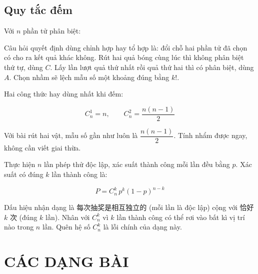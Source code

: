 \documentclass[11pt, a4paper]{article}
\begin{document}
\subsection{Quy tắc đếm}

\begin{dinhly}
Với $n$ phần tử phân biệt:


 Câu hỏi quyết định dùng chỉnh hợp hay tổ hợp là: đổi chỗ hai phần tử đã chọn có cho ra kết quả khác không. Rút hai quả bóng cùng lúc thì không phân biệt thứ tự, dùng $C$. Lấy lần lượt quả thứ nhất rồi quả thứ hai thì có phân biệt, dùng $A$. Chọn nhầm sẽ lệch mẫu số một khoảng đúng bằng $k!$.

 Hai công thức hay dùng nhất khi đếm:

$$C_n^1 = n, \qquad C_n^2 = \frac{n(n-1)}{2}$$

Với bài rút hai vật, mẫu số gần như luôn là $\dfrac{n(n-1)}{2}$. Tính nhẩm được ngay, không cần viết giai thừa.
\end{dinhly}
\begin{dinhly}
Thực hiện $n$ lần phép thử độc lập, xác suất thành công mỗi lần đều bằng $p$. Xác suất có đúng $k$ lần thành công là:

$$P = C_n^k \, p^k (1-p)^{n-k}$$

 Dấu hiệu nhận dạng là 每次抽奖是相互独立的 (mỗi lần là độc lập) cộng với 恰好 $k$ 次 (đúng $k$ lần). Nhân với $C_n^k$ vì $k$ lần thành công có thể rơi vào bất kì vị trí nào trong $n$ lần. Quên hệ số $C_n^k$ là lỗi chính của dạng này.

\end{dinhly}
\section{CÁC DẠNG BÀI}
\end{document}

